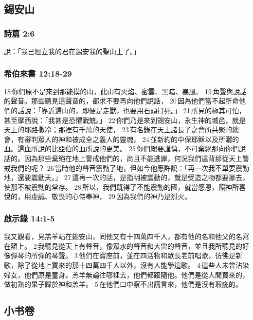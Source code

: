 \subsection{錫安山}
\subsubsection{詩篇 2:6}
說：「我已經立我的君在錫安我的聖山上了。」
\subsubsection{希伯來書 12:18-29}
18 你們原不是來到那能摸的山，此山有火焰、密雲、黑暗、暴風、 19 角聲與說話的聲音。那些聽見這聲音的，都求不要再向他們說話， 20 因為他們當不起所命他們的話說：「靠近這山的，即便是走獸，也要用石頭打死。」 21 所見的極其可怕，甚至摩西說：「我甚是恐懼戰兢。」 22 你們乃是來到錫安山，永生神的城邑，就是天上的耶路撒冷；那裡有千萬的天使， 23 有名錄在天上諸長子之會所共聚的總會，有審判眾人的神和被成全之義人的靈魂， 24 並新約的中保耶穌以及所灑的血。這血所說的比亞伯的血所說的更美。 25 你們總要謹慎，不可棄絕那向你們說話的。因為那些棄絕在地上警戒他們的，尚且不能逃罪，何況我們違背那從天上警戒我們的呢？ 26 當時他的聲音震動了地，但如今他應許說：「再一次我不單要震動地，還要震動天。」 27 這再一次的話，是指明被震動的，就是受造之物都要挪去，使那不被震動的常存。 28 所以，我們既得了不能震動的國，就當感恩，照神所喜悅的，用虔誠、敬畏的心侍奉神， 29 因為我們的神乃是烈火。
\subsubsection{啟示錄 14:1-5 }
我又觀看，見羔羊站在錫安山，同他又有十四萬四千人，都有他的名和他父的名寫在額上。 2 我聽見從天上有聲音，像眾水的聲音和大雷的聲音，並且我所聽見的好像彈琴的所彈的琴聲。 3 他們在寶座前，並在四活物和眾長老前唱歌，彷彿是新歌，除了從地上買來的那十四萬四千人以外，沒有人能學這歌。 4 這些人未曾沾染婦女，他們原是童身。羔羊無論往哪裡去，他們都跟隨他。他們是從人間買來的，做初熟的果子歸於神和羔羊。 5 在他們口中察不出謊言來，他們是沒有瑕疵的。

\subsection{小书卷}

